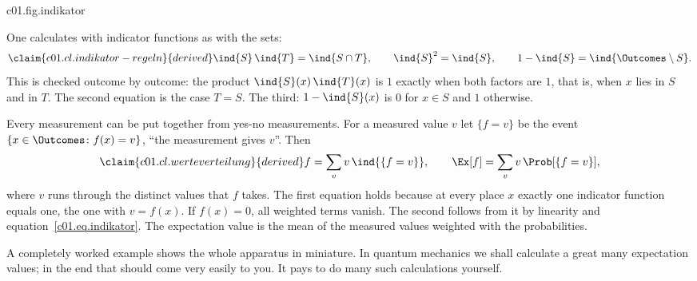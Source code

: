\begin{tpcfigure}{c01.fig.indikator}

  \caption{A yes-no measurement on the loaded die of equation~\eqref{c01.eq.gezinkt}.
    (a) The indicator function of the event $S = \{2,4,6\}$, dashed like all
    measurements. (b) The weights $\pw(x)$ (outlines) and the products $\pw(x)\,\ind{S}(x)$
    (hatched): the indicator function leaves only the bars over $S$. Their heights add
    up to $\Ex[\ind{S}] = \Prob[S] = \tfrac{7}{12}$.}
\end{tpcfigure}

One calculates with indicator functions as with the sets:
\begin{equation}\label{c01.eq.indikator-regeln}\claim{c01.cl.indikator-regeln}{derived}
  \ind{S}\,\ind{T} = \ind{S \cap T},
  \qquad
  \ind{S}^2 = \ind{S},
  \qquad
  1 - \ind{S} = \ind{\Outcomes \setminus S} .
\end{equation}
This is checked outcome by outcome: the product $\ind{S}(x)\,\ind{T}(x)$ is $1$ exactly
when both factors are $1$, that is, when $x$ lies in $S$ and in $T$. The second
equation is the case $T = S$. The third: $1 - \ind{S}(x)$ is $0$ for $x \in S$ and $1$
otherwise.

Every measurement can be put together from yes-no measurements. For a measured value $v$
let $\{f = v\}$ be the event $\{x \in \Outcomes \colon f(x) = v\}$, “the measurement gives
$v$”. Then
\begin{equation}\label{c01.eq.werteverteilung}\claim{c01.cl.werteverteilung}{derived}
  f = \sum_{v} v\, \ind{\{f = v\}},
  \qquad
  \Ex[f] = \sum_{v} v\, \Prob[\{f = v\}] ,
\end{equation}
where $v$ runs through the distinct values that $f$ takes. The first equation holds
because at every place $x$ exactly one indicator function equals one, the one with
$v = f(x)$. If $f(x) = 0$, all weighted terms vanish. The second follows from it by linearity and equation~\eqref{c01.eq.indikator}. The
expectation value is the mean of the measured values weighted with the probabilities.

A completely worked example shows the whole apparatus in miniature. In quantum mechanics we
shall calculate a great many expectation values; in the end that should come very easily to
you. It pays to do many such calculations yourself.

